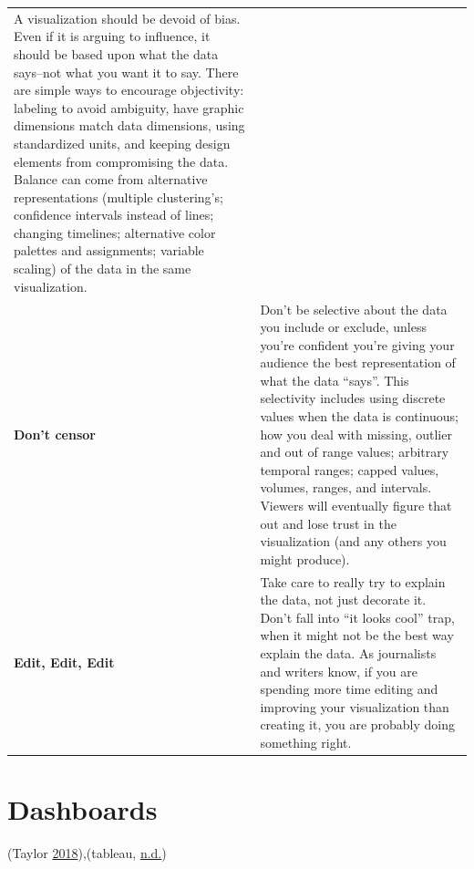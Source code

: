 \documentclass[]{book}
\begin{document}
\begin{longtable}[]{@{}ll@{}}
\begin{minipage}[t]{0.75\columnwidth}
A visualization should be devoid of bias. Even if it is arguing to influence, it should be based upon what the data says--not what you want it to say. There are simple ways to encourage objectivity: labeling to avoid ambiguity, have graphic dimensions match data dimensions, using standardized units, and keeping design elements from compromising the data. Balance can come from alternative representations (multiple clustering's; confidence intervals instead of lines; changing timelines; alternative color palettes and assignments; variable scaling) of the data in the same visualization.\strut
\end{minipage}\tabularnewline
\begin{minipage}[t]{0.19\columnwidth}\raggedright
\textbf{Don't censor}\strut
\end{minipage} & \begin{minipage}[t]{0.75\columnwidth}\raggedright
Don't be selective about the data you include or exclude, unless you're confident you're giving your audience the best representation of what the data ``says''. This selectivity includes using discrete values when the data is continuous; how you deal with missing, outlier and out of range values; arbitrary temporal ranges; capped values, volumes, ranges, and intervals. Viewers will eventually figure that out and lose trust in the visualization (and any others you might produce).\strut
\end{minipage}\tabularnewline
\begin{minipage}[t]{0.19\columnwidth}\raggedright
\textbf{Edit, Edit, Edit}\strut
\end{minipage} & \begin{minipage}[t]{0.75\columnwidth}\raggedright
Take care to really try to explain the data, not just decorate it. Don't fall into ``it looks cool'' trap, when it might not be the best way explain the data. As journalists and writers know, if you are spending more time editing and improving your visualization than creating it, you are probably doing something right.\strut
\end{minipage}\tabularnewline
\bottomrule
\end{longtable}

\hypertarget{dashboards}{%
\section{Dashboards}\label{dashboards}}

(Taylor \protect\hyperlink{ref-intuitive_dash}{2018}),(tableau, \protect\hyperlink{ref-dashboard_practices}{n.d.})
\end{document}
